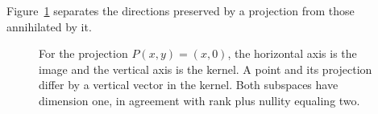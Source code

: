 Figure~\ref{fig:atlas-kernel-image} separates the directions preserved by a projection from those annihilated by it.

\begin{figure}[!htbp]
\centering
{}
\caption{For the projection $P(x,y)=(x,0)$, the horizontal axis is the image and the vertical axis is the kernel. A point and its projection differ by a vertical vector in the kernel. Both subspaces have dimension one, in agreement with rank plus nullity equaling two.}
\label{fig:atlas-kernel-image}
\end{figure}